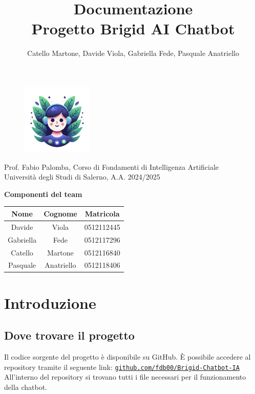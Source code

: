 \documentclass[12pt, letterpaper]{article}
\title{\Huge \textbf{Documentazione}\\[0.5cm]
\Large \textbf{Progetto Brigid AI Chatbot}}
\author{\large Catello Martone, Davide Viola, Gabriella Fede, Pasquale Anatriello}
\begin{document}
	
\begin{figure}[t]
\centering
\includegraphics[width=0.3\textwidth]{immagini/brigid.png}
\end{figure}
	
\maketitle

\vfill
\begin{center}
Prof. Fabio Palomba, Corso di Fondamenti di Intelligenza Artificiale\\
Università degli Studi di Salerno, A.A. 2024/2025
\end{center}
	
	
\newpage
{\Large \textbf{Componenti del team}}
\begin{table}[h]
	\centering
	\large %
	\begin{tabular}{|c|c|c|}
		\hline
		\textbf{Nome} & \textbf{Cognome} & \textbf{Matricola} \\
		\hline
		Davide  & Viola      & 0512112445 \\
		Gabriella & Fede      & 0512117296 \\
		Catello  & Martone    & 0512116840 \\
		Pasquale & Anatriello & 0512118406 \\
		\hline
	\end{tabular}
	\label{tab:studenti}
\end{table}
\newpage
\tableofcontents
\newpage
	
\section{Introduzione}
	
\subsection{Dove trovare il progetto}
Il codice sorgente del progetto è disponibile su GitHub. È possibile accedere al repository tramite il seguente link:  
\noindent\href{https://github.com/fdb00/Brigid-Chatbot-IA.git}{\texttt{github.com/fdb00/Brigid-Chatbot-IA}}\\
All'interno del repository si trovano tutti i file necessari per il funzionamento della chatbot.
\end{document}
